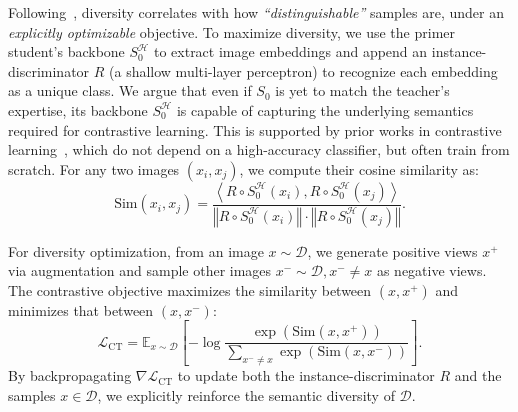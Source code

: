 \documentclass[12pt, a4paper, twoside]{book}
\numberwithin{equation}{chapter}
\theoremstyle{plain}
\theoremstyle{definition}
\theoremstyle{remark}
\newenvironment{foldable}{}{}
\begin{document}
\begin{foldable} Following~\cite{fang2021contrastive}, diversity correlates with how \textit{``distinguishable''} samples are, under an \textit{explicitly optimizable} objective.
  To maximize diversity, we use the primer student's backbone $S_{0}^\mathcal{H}$ to extract image embeddings and append an instance-discriminator $R$ (a shallow multi-layer perceptron) to recognize each embedding as a unique class.
  We argue that even if $S_0$ is yet to match the teacher's expertise, its backbone $S_{0}^\mathcal{H}$ is capable of capturing the underlying semantics required for contrastive learning.
  This is supported by prior works in contrastive learning~\cite{chen2020simple,he2020momentum,zbontar2021barlow}, which do not depend on a high-accuracy classifier, but often train from scratch.
  For any two images $(x_i, x_j)$, we compute their cosine similarity as:
  \begin{equation}
    \text{Sim}\left(x_i, x_j\right)=
    \frac{ \left\langle R \circ S_{0}^\mathcal{H}(x_i), R \circ S_{0}^\mathcal{H}(x_j)\right\rangle }{ \left\Vert R \circ S_{0}^\mathcal{H}(x_i) \right\Vert \cdot \left\Vert R \circ S_{0}^\mathcal{H}(x_j) \right\Vert }.
  \end{equation}
\end{foldable}

\begin{foldable} For diversity optimization, from an image $x \sim \mathcal{D}$, we generate positive views $x^{+}$ via augmentation and sample other images $x^{-} \sim \mathcal{D}, x^{-} \neq x$ as negative views.
  The contrastive objective maximizes the similarity between $(x, x^{+})$ and minimizes that between $(x, x^{-})$:
  \begin{equation} \label{eq:loss-contrastive}
    \mathcal{L}_\text{CT} = \mathbb{E}_{x \sim \mathcal{D}} \left[
      -\log \frac{ \exp\left( \text{Sim}(x, x^{+}) \right) }{ \sum_{x^{-} \ne x} \exp\left( \text{Sim}(x, x^{-}) \right) }
    \right].
  \end{equation}
  By backpropagating $\nabla\mathcal{L}_\text{CT}$ to update both the instance-discriminator $R$ and the samples $x \in \mathcal{D}$, we explicitly reinforce the semantic diversity of $\mathcal{D}$.
\end{foldable}
\end{document}
